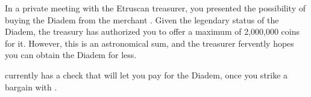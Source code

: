 \documentclass[green]{Kos}
\begin{document}
\name{\gScythiaDiadem{}}

In a private meeting with the Etruscan treasurer, you presented the possibility of buying the Diadem from the merchant \cMerchant{}. Given the legendary status of the Diadem, the treasury has authorized you to offer a maximum of 2,000,000 coins for it. However, this is an astronomical sum, and the treasurer fervently hopes you can obtain the Diadem for less.

\cScythiaKing{} currently has a check that will let you pay for the Diadem, once you strike a bargain with \cMerchant{}.
\end{document}
